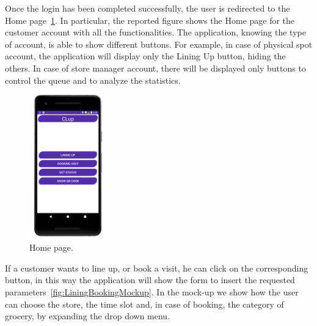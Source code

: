 Once the login has been completed successfully, the user is redirected to the Home page~\ref{fig:HomeMockup}.
In particular, the reported figure shows the Home page for the customer account with all the functionalities. The application, knowing the type of account, is able to show different buttons. For example, in case of physical spot account, the application will display only the Lining Up button, hiding the others. In case of store manager account, there will be displayed only buttons to control the queue and to analyze the statistics. 

\begin{figure}[H]
	\centering
	\includegraphics[width=0.3\textwidth]{images/home.png}
	\caption{Home page.}
	\label{fig:HomeMockup}
\end{figure}

If a customer wants to line up, or book a visit, he can click on the corresponding button, in this way the application will show the form to insert the requested parameters~\ref{fig:LiningBookingMockup}.
In the mock-up we show how the user can choose the store, the time slot and, in case of booking, the category of grocery, by expanding the drop down menu.

